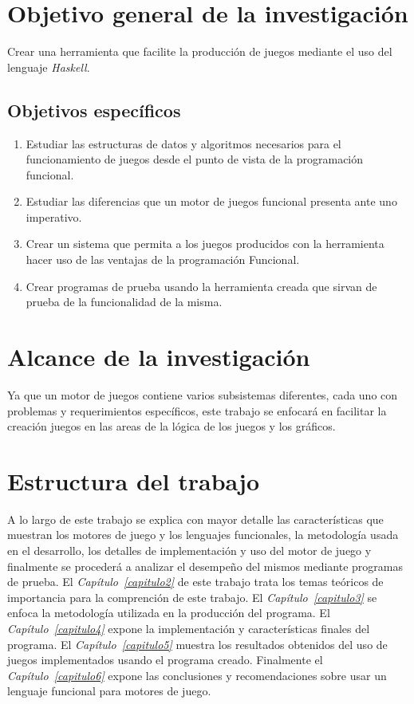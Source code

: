 \section{Objetivo general de la investigación}

Crear una herramienta que facilite la producción de juegos mediante el uso del lenguaje \emph{Haskell}.

\subsection{Objetivos específicos}

\begin{enumerate}
  \item Estudiar las estructuras de datos y algoritmos necesarios para el funcionamiento de juegos desde el punto de vista de la programación funcional.
  \item Estudiar las diferencias que un motor de juegos funcional presenta ante uno imperativo.
  \item Crear un sistema que permita a los juegos producidos con la herramienta hacer uso de las ventajas de la programación Funcional.
  \item Crear programas de prueba usando la herramienta creada que sirvan de prueba de la funcionalidad de la misma.
\end{enumerate}

\section{Alcance de la investigación}

Ya que un motor de juegos contiene varios subsistemas diferentes, cada uno con problemas y requerimientos específicos, este trabajo se enfocará en facilitar la creación juegos en las areas de la lógica de los juegos y los gráficos.

\section{Estructura del trabajo}

A lo largo de este trabajo se explica con mayor detalle las características que muestran los motores de juego y los lenguajes funcionales, la metodología usada en el desarrollo, los detalles de implementación y uso del motor de juego y finalmente se procederá a analizar el desempeño del mismos mediante programas de prueba. El \emph{Capítulo~\ref{capitulo2}} de este trabajo trata los temas teóricos de importancia para la comprención de este trabajo. El \emph{Capítulo~\ref{capitulo3}} se enfoca la metodología utilizada en la producción del programa. El \emph{Capítulo~\ref{capitulo4}} expone la implementación y características finales del programa. El \emph{Capítulo~\ref{capitulo5}} muestra los resultados obtenidos del uso de juegos implementados usando el programa creado. Finalmente el \emph{Capítulo~\ref{capitulo6}} expone las conclusiones y recomendaciones sobre usar un lenguaje funcional para motores de juego.
